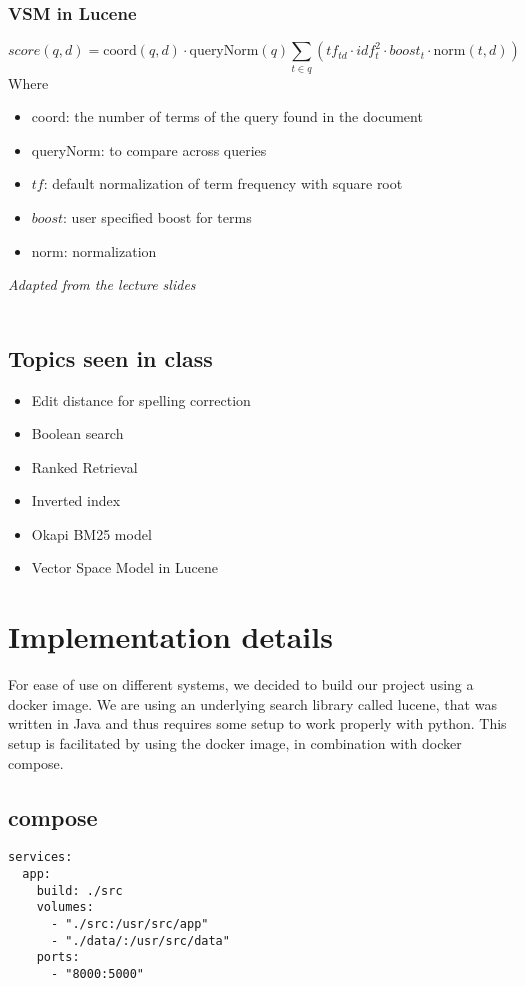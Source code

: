 \documentclass{article}
\begin{document}
\subsubsection{VSM in Lucene}
$$score(q,d) = \text{coord}(q,d) \cdot \text{queryNorm}(q) \displaystyle \sum_{t\in q}\left(tf_{td} \cdot idf_t^2 \cdot boost_t \cdot \text{norm}(t,d)\right)$$
Where \begin{itemize}
    \item coord: the number of terms of the query found in the document
    \item queryNorm: to compare across queries
    \item $tf$: default normalization of term frequency with square root
    \item $boost$: user specified boost for terms
    \item norm: normalization
\end{itemize}
\small
\textit{Adapted from the lecture slides}\\~\\
\normalsize

\subsection{Topics seen in class}
\begin{itemize}
    \item Edit distance for spelling correction
    \item Boolean search
    \item Ranked Retrieval
    \item Inverted index %
    \item Okapi BM25 model
    \item Vector Space Model in Lucene
\end{itemize}

\section{Implementation details}
For ease of use on different systems, we decided to build our project
using a docker image. We are using an underlying search library called lucene,
that was written in Java and thus requires some setup to work properly with
python. This setup is facilitated by using the docker image,
in combination with docker compose.
\subsection{compose}
\begin{lstlisting}
services:
  app:
    build: ./src
    volumes:
      - "./src:/usr/src/app"
      - "./data/:/usr/src/data"
    ports:
      - "8000:5000"
\end{lstlisting}
\end{document}
